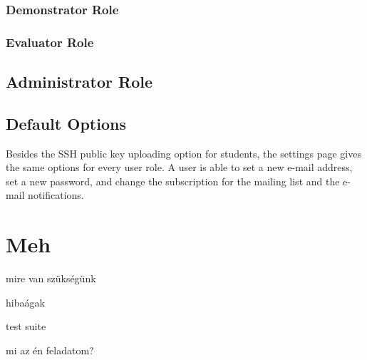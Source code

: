 \subsubsection{Demonstrator Role}

\subsubsection{Evaluator Role}

\subsection{Administrator Role}

\subsection{Default Options}

Besides the SSH public key uploading option for students, the settings page gives the same options for every user role. A user is able to set a new e-mail address, set a new password, and change the subscription for the mailing list and the e-mail notifications.



\section{Meh}

mire van szükségünk

hibaágak

test suite

mi az én feladatom?